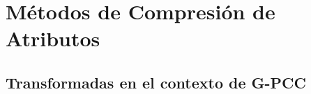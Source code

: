 


\section{Métodos de Compresión de Atributos}

    \subsection{Transformadas en el contexto de G-PCC}

